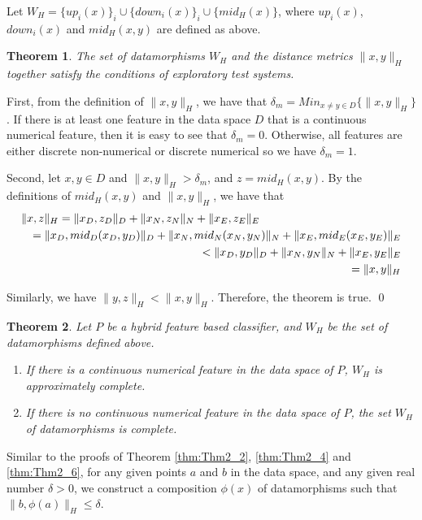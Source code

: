 \documentclass[preprint,1p,authoryear,times]{elsarticle}
\newtheorem{Theorem} {Theorem}
\begin{document}
Let $W_H = \{up_i(x)\}_i \cup \{down_i(x)\}_i \cup \{mid_H(x)\}$, where $up_i(x)$, $down_i(x)$ and $mid_H(x,y)$ are defined as above. 

\begin{Theorem}
The set of datamorphisms $W_H$ and the distance metrics $\|x,y\|_H$ together satisfy the conditions of exploratory test systems. 
\end{Theorem}
First, from the definition of $\|x,y\|_H$, we have that $\delta_m = Min_{x\neq y\in D}\{\|x,y\|_H\}$. If there is at least one feature in the data space $D$ that is a continuous numerical feature, then it is easy to see that $\delta_m = 0$. Otherwise, all features are either discrete non-numerical or discrete numerical so we have $\delta_m = 1$. 

Second, let $x,y \in D$ and $\|x,y\|_H > \delta_m$, and $z=mid_H(x,y)$. By the definitions of $mid_H(x,y)$ and $\|x,y\|_H$, we have that 
\begin{eqnarray*}
\lefteqn{\|x,z\|_H = \|x_D, z_D\|_D + \|x_N, z_N\|_N + \|x_E, z_E\|_E}\\
&& = \|x_D, mid_D(x_D, y_D)\|_D + \|x_N, mid_N(x_N, y_N)\|_N + \|x_E, mid_E(x_E, y_E)\|_E\\
&& < \|x_D, y_D\|_D + \|x_N, y_N\|_N + \|x_E, y_E\|_E \\
&& = \|x,y\|_H
\end{eqnarray*}

Similarly, we have $\|y,z\|_H < \|x,y\|_H$. Therefore, the theorem is true. \qed

\begin{Theorem}
Let $P$ be a hybrid feature based classifier, and $W_H$ be the set of datamorphisms defined above.  
\begin{enumerate}
\item If there is a continuous numerical feature in the data space of $P$, $W_H$ is approximately complete. 
\item If there is no continuous numerical feature in the data space of $P$, the set $W_H$ of datamorphisms is complete. 
\end{enumerate}
\end{Theorem}


Similar to the proofs of Theorem \ref{thm:Thm2_2}, \ref{thm:Thm2_4} and \ref{thm:Thm2_6}, for any given points $a$ and $b$ in the data space, and any given real number $\delta>0$, we construct a composition $\phi(x)$ of datamorphisms such that $\|b, \phi(a)\|_H \leq \delta$. 
\end{document}

